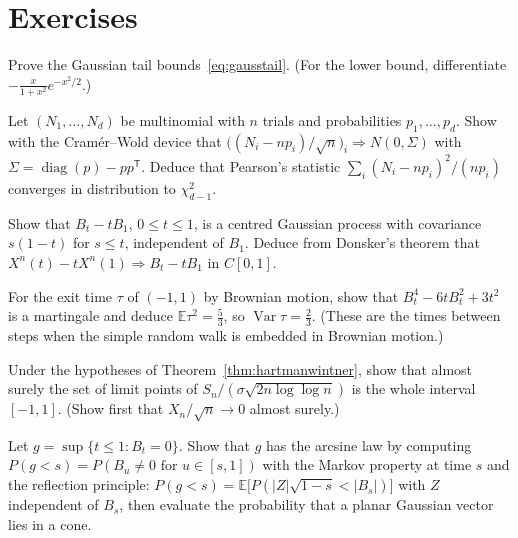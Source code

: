 \section{Exercises}

\begin{exercise}[$\star$]\label{ex:gausstail}
Prove the Gaussian tail bounds~\eqref{eq:gausstail}. (For the lower bound, differentiate $-\frac x{1+x^2}e^{-x^2/2}$.)
\end{exercise}

\begin{exercise}[$\star$]\label{ex:multinomial}
Let $(N_1,\dots,N_d)$ be multinomial with $n$ trials and probabilities $p_1,\dots,p_d$. Show with the Cram\'er--Wold device that $\bigl((N_i-np_i)/\sqrt n\bigr)_i\Rightarrow N(0,\Sigma)$
with $\Sigma=\operatorname{diag}(p)-pp^{\mathsf T}$. Deduce that Pearson's statistic $\sum_i(N_i-np_i)^2/(np_i)$ converges in distribution to $\chi^2_{d-1}$.
\end{exercise}

\begin{exercise}[$\star$]\label{ex:bridge}
Show that $B_t-tB_1$, $0\le t\le1$, is a centred Gaussian process with covariance $s(1-t)$ for $s\le t$, independent of $B_1$. Deduce from Donsker's theorem that
$X^n(t)-tX^n(1)\Rightarrow B_t-tB_1$ in $C[0,1]$.
\end{exercise}

\begin{exercise}[$\star\star$]\label{ex:exitvar}
For the exit time $\tau$ of $(-1,1)$ by Brownian motion, show that $B_t^4-6tB_t^2+3t^2$ is a martingale and deduce $\mathbb E\tau^2=\frac53$, so $\operatorname{Var}\tau=\frac23$. (These
are the times between steps when the simple random walk is embedded in Brownian motion.)
\end{exercise}

\begin{exercise}[$\star\star$]\label{ex:clusterset}
Under the hypotheses of Theorem~\ref{thm:hartmanwintner}, show that almost surely the set of limit points of $S_n/(\sigma\sqrt{2n\log\log n})$ is the whole interval $[-1,1]$.
(Show first that $X_n/\sqrt n\to0$ almost surely.)
\end{exercise}

\begin{exercise}[$\star\star$]\label{ex:lastzero}
Let $g=\sup\{t\le1:B_t=0\}$. Show that $g$ has the arcsine law by computing $P(g<s)=P(B_u\ne0\text{ for }u\in[s,1])$ with the Markov property at time $s$ and the reflection
principle: $P(g<s)=\mathbb E\bigl[P(|Z|\sqrt{1-s}<|B_s|)\bigr]$ with $Z$ independent of $B_s$, then evaluate the probability that a planar Gaussian vector lies in a cone.
\end{exercise}

